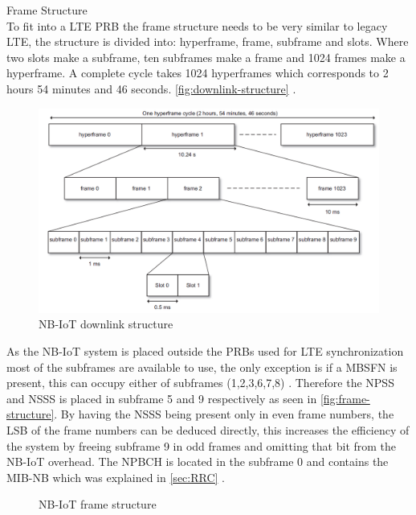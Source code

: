 Frame Structure\\
To fit into a \gls{LTE} \gls{PRB} the frame structure needs to be very similar to legacy \gls{LTE}, the structure is divided into: hyperframe, frame, subframe and slots. Where two slots make a subframe, ten subframes make a frame and 1024 frames make a hyperframe. A complete cycle takes 1024 hyperframes which corresponds to 2 hours 54 minutes and 46 seconds.  \autoref{fig:downlink-structure} \citep[ch. 7.2]{NB-IoT_Book}. 


\begin{figure}[H]
\centering
\includegraphics[width=\textwidth]{figures/downlink_structure_15kHz.png}
\caption{\gls{NB-IoT} downlink structure \citep[Fig. 7.7]{NB-IoT_Book}}
\label{fig:downlink-structure}
\end{figure}


As the \gls{NB-IoT} system is placed outside the \gls{PRB}s used for LTE synchronization most of the subframes are available to use, the only exception is if a \gls{MBSFN} is present, this can occupy either of subframes (1,2,3,6,7,8) \citep{LTE-MBSFN}. Therefore the \gls{NPSS} and \gls{NSSS} is placed in subframe 5 and 9 respectively as seen in \autoref{fig:frame-structure}. By having the \gls{NSSS} being present only in even frame numbers, the \gls{LSB} of the frame numbers can be deduced directly, this increases the efficiency of the system by freeing subframe 9 in odd frames and omitting that bit from the \gls{NB-IoT} overhead. The \gls{NPBCH} is located in the subframe 0 and contains the \gls{MIB-NB} which was explained in \autoref{sec:RRC} \citep{REL-13}.  

\begin{figure}[H]
\centering

\caption{\gls{NB-IoT} frame structure \citep{REL-13}}
\label{fig:frame-structure}
\end{figure}


